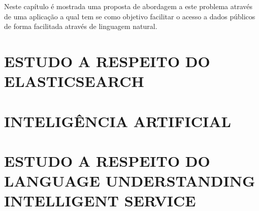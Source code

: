 Neste capítulo é mostrada uma proposta de abordagem a este problema através de uma aplicação a qual tem se como objetivo facilitar o acesso a dados públicos de forma facilitada através de linguagem natural.

\section{\uppercase{Estudo a respeito do Elasticsearch}}


\section{\uppercase{Inteligência Artificial}}


\section{\uppercase{Estudo a respeito do Language Understanding Intelligent Service}}



